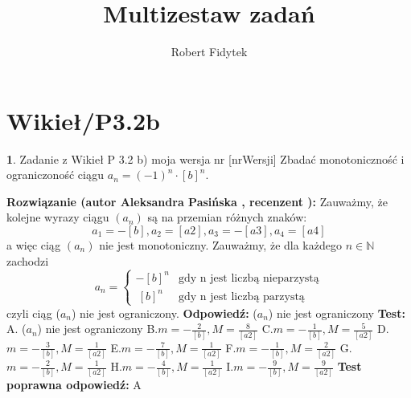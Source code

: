 \documentclass[12pt, a4paper]{article}
\title{Multizestaw zadań}
\author{Robert Fidytek}
\date{}
\theoremstyle{definition} %
\newtheorem{zad}{}
\newcommand{\kategoria}[1]{\section{#1}} %
\newcommand{\zadStart}[1]{\begin{zad}#1\newline} %
\newcommand{\zadStop}{\end{zad}}   %
\newcommand{\rozwStart}[2]{\noindent \textbf{Rozwiązanie (autor #1 , recenzent #2): }\newline} %
\newcommand{\rozwStop}{\newline}                                            %
\newcommand{\odpStart}{\noindent \textbf{Odpowiedź:}\newline}    %
\newcommand{\odpStop}{\newline}                                             %
\newcommand{\testStart}{\noindent \textbf{Test:}\newline} %
\newcommand{\testStop}{\newline} %
\newcommand{\kluczStart}{\noindent \textbf{Test poprawna odpowiedź:}\newline} %
\newcommand{\kluczStop}{\newline} %
\begin{document}
\maketitle


\kategoria{Wikieł/P3.2b}
\zadStart{Zadanie z Wikieł P 3.2 b) moja wersja nr [nrWersji]}
Zbadać monotoniczność i ograniczoność ciągu $a_{n}=(-1)^n\cdot[b]^n$.
\zadStop
\rozwStart{Aleksandra Pasińska}{}
Zauważmy, że kolejne wyrazy ciągu $(a_{n})$ są na przemian różnych znaków:
$$a_{1}=-[b], a_{2}=[a2],a_{3}=-[a3],a_{4}=[a4]$$ 
a więc ciąg $(a_{n})$ nie jest monotoniczny.
Zauważmy, że dla każdego $n \in \mathbb{N}$ zachodzi 
$$a_{n}=\left\{ \begin{array}{ll}-[b]^n & \textrm{gdy n jest liczbą nieparzystą}\\ \
      [b]^n & \textrm{gdy n jest liczbą parzystą}\end{array} \right.$$
czyli ciąg ($a_{n}$) nie jest ograniczony.
\rozwStop
\odpStart
($a_{n}$) nie jest ograniczony
\odpStop
\testStart
A. ($a_{n}$) nie jest ograniczony
B.$m=-\frac{2}{[b]},M=\frac{8}{[a2]}$
C.$m=-\frac{1}{[b]},M=\frac{5}{[a2]}$
D.$m=-\frac{3}{[b]},M=\frac{1}{[a2]}$
E.$m=-\frac{7}{[b]},M=\frac{1}{[a2]}$
F.$m=-\frac{1}{[b]},M=\frac{2}{[a2]}$
G.$m=-\frac{2}{[b]},M=\frac{1}{[a2]}$
H.$m=-\frac{4}{[b]},M=\frac{1}{[a2]}$
I.$m=-\frac{9}{[b]},M=\frac{9}{[a2]}$
\testStop
\kluczStart
A
\kluczStop
\end{document}
